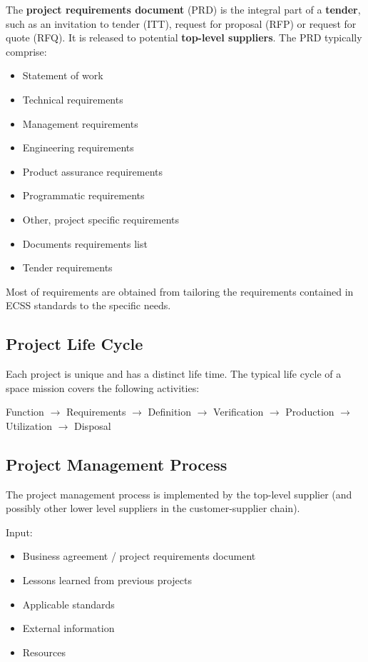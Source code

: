 The \textbf{project requirements document} (PRD) is the integral part of a \textbf{tender}, such as an invitation to tender (ITT), request for proposal (RFP) or request for quote (RFQ). It is released to potential \textbf{top-level suppliers}. The PRD typically comprise:

\begin{itemize}
\item Statement of work
\item Technical requirements
\item Management requirements
\item Engineering requirements
\item Product assurance requirements
\item Programmatic requirements
\item Other, project specific requirements
\item Documents requirements list
\item Tender requirements
\end{itemize}

Most of requirements are obtained from tailoring the requirements contained in ECSS standards to the specific needs. 

\subsection{Project Life Cycle}

Each project is unique and has a distinct life time. The typical life cycle of a space mission covers the following activities:

Function 
$\rightarrow$ Requirements
$\rightarrow$ Definition
$\rightarrow$ Verification
$\rightarrow$ Production
$\rightarrow$ Utilization
$\rightarrow$ Disposal

\subsection{Project Management Process}

The project management process is implemented by the top-level supplier (and possibly other lower level suppliers in the customer-supplier chain).

Input: 
\begin{itemize}
\item Business agreement / project requirements document
\item Lessons learned from previous projects
\item Applicable standards
\item External information
\item Resources 
\end{itemize}


